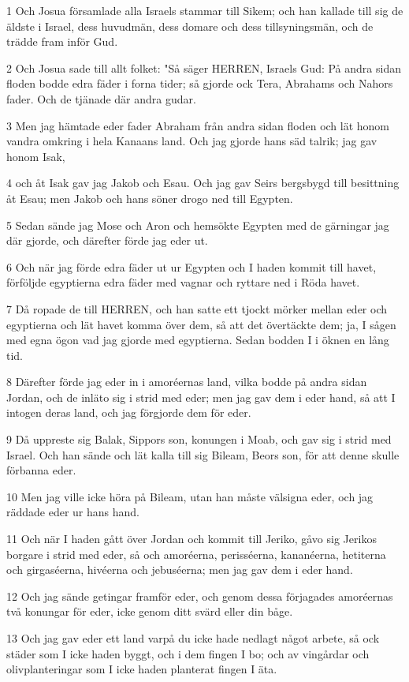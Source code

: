 \par 1 Och Josua församlade alla Israels stammar till Sikem; och han kallade till sig de äldste i Israel, dess huvudmän, dess domare och dess tillsyningsmän, och de trädde fram inför Gud.
\par 2 Och Josua sade till allt folket: "Så säger HERREN, Israels Gud: På andra sidan floden bodde edra fäder i forna tider; så gjorde ock Tera, Abrahams och Nahors fader. Och de tjänade där andra gudar.
\par 3 Men jag hämtade eder fader Abraham från andra sidan floden och lät honom vandra omkring i hela Kanaans land. Och jag gjorde hans säd talrik; jag gav honom Isak,
\par 4 och åt Isak gav jag Jakob och Esau. Och jag gav Seirs bergsbygd till besittning åt Esau; men Jakob och hans söner drogo ned till Egypten.
\par 5 Sedan sände jag Mose och Aron och hemsökte Egypten med de gärningar jag där gjorde, och därefter förde jag eder ut.
\par 6 Och när jag förde edra fäder ut ur Egypten och I haden kommit till havet, förföljde egyptierna edra fäder med vagnar och ryttare ned i Röda havet.
\par 7 Då ropade de till HERREN, och han satte ett tjockt mörker mellan eder och egyptierna och lät havet komma över dem, så att det övertäckte dem; ja, I sågen med egna ögon vad jag gjorde med egyptierna. Sedan bodden I i öknen en lång tid.
\par 8 Därefter förde jag eder in i amoréernas land, vilka bodde på andra sidan Jordan, och de inläto sig i strid med eder; men jag gav dem i eder hand, så att I intogen deras land, och jag förgjorde dem för eder.
\par 9 Då uppreste sig Balak, Sippors son, konungen i Moab, och gav sig i strid med Israel. Och han sände och lät kalla till sig Bileam, Beors son, för att denne skulle förbanna eder.
\par 10 Men jag ville icke höra på Bileam, utan han måste välsigna eder, och jag räddade eder ur hans hand.
\par 11 Och när I haden gått över Jordan och kommit till Jeriko, gåvo sig Jerikos borgare i strid med eder, så och amoréerna, perisséerna, kananéerna, hetiterna och girgaséerna, hivéerna och jebuséerna; men jag gav dem i eder hand.
\par 12 Och jag sände getingar framför eder, och genom dessa förjagades amoréernas två konungar för eder, icke genom ditt svärd eller din båge.
\par 13 Och jag gav eder ett land varpå du icke hade nedlagt något arbete, så ock städer som I icke haden byggt, och i dem fingen I bo; och av vingårdar och olivplanteringar som I icke haden planterat fingen I äta.
